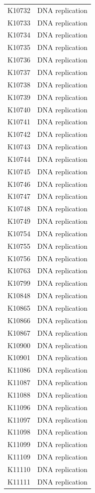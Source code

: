 \begin{longtable}{@{}l l@{}}
K10732 & DNA replication \\
K10733 & DNA replication \\
K10734 & DNA replication \\
K10735 & DNA replication \\
K10736 & DNA replication \\
K10737 & DNA replication \\
K10738 & DNA replication \\
K10739 & DNA replication \\
K10740 & DNA replication \\
K10741 & DNA replication \\
K10742 & DNA replication \\
K10743 & DNA replication \\
K10744 & DNA replication \\
K10745 & DNA replication \\
K10746 & DNA replication \\
K10747 & DNA replication \\
K10748 & DNA replication \\
K10749 & DNA replication \\
K10754 & DNA replication \\
K10755 & DNA replication \\
K10756 & DNA replication \\
K10763 & DNA replication \\
K10799 & DNA replication \\
K10848 & DNA replication \\
K10865 & DNA replication \\
K10866 & DNA replication \\
K10867 & DNA replication \\
K10900 & DNA replication \\
K10901 & DNA replication \\
K11086 & DNA replication \\
K11087 & DNA replication \\
K11088 & DNA replication \\
K11096 & DNA replication \\
K11097 & DNA replication \\
K11098 & DNA replication \\
K11099 & DNA replication \\
K11109 & DNA replication \\
K11110 & DNA replication \\
K11111 & DNA replication \\

\end{longtable}
